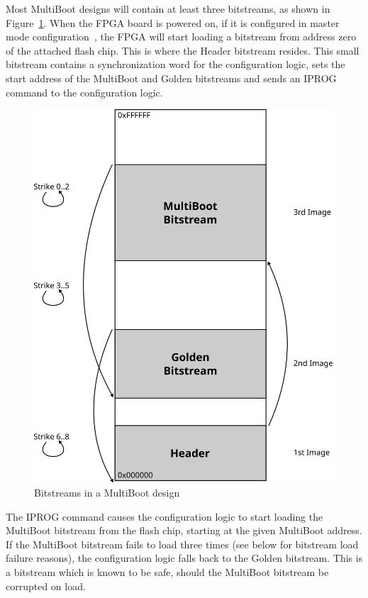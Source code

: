 \documentclass[a4paper,11pt]{article}
\begin{document}
Most MultiBoot designs will contain at least three bitstreams, as shown in
Figure~\ref{fig:multiboot}. When the FPGA board is powered on, if it is configured
in master mode configuration~\cite{ug380}, the FPGA will start loading a bitstream
from address zero of the attached flash chip. This is where the Header bitstream
resides. This small bitstream contains a synchronization word for the configuration
logic, sets the start address of the MultiBoot and Golden bitstreams and sends
an IPROG command to the configuration logic.

\begin{figure}
  \centerline{\includegraphics[scale=.45]{fig/multiboot}}
  \label{fig:multiboot}
  \caption{Bitstreams in a MultiBoot design}
\end{figure}

The IPROG command causes the configuration logic to start loading the MultiBoot 
bitstream from the flash chip, starting at the given MultiBoot address. If the MultiBoot
bitstream fails to load three times (see below for bitstream load failure reasons),
the configuration logic falls back to the Golden bitstream. This is a bitstream
which is known to be safe, should the MultiBoot bitstream be corrupted on load.
\end{document}
